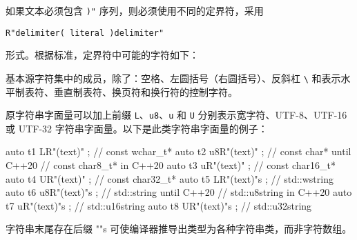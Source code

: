 如果文本必须包含 \verb|)"| 序列，则必须使用不同的定界符，采用

\verb|R"delimiter( literal )delimiter"|

形式。根据标准，定界符中可能的字符如下：

\begin{myTip}
基本源字符集中的成员，除了：空格、左圆括号（右圆括号）、反斜杠 \verb|\| 和表示水平制表符、垂直制表符、换页符和换行符的控制字符。
\end{myTip}

原字符串字面量可以加上前缀 \verb|L|、\verb|u8|、\verb|u| 和 \verb|U| 分别表示宽字符、UTF-8、UTF-16 或 UTF-32 字符串字面量。以下是此类字符串字面量的例子：

\begin{cpp}
auto t1{ LR"(text)"  };  // const wchar_t*
auto t2{ u8R"(text)" };  // const char* until C++20
// const char8_t* in C++20
auto t3{ uR"(text)"  };  // const char16_t*
auto t4{ UR"(text)"  };  // const char32_t*
auto t5{ LR"(text)"s  }; // std::wstring
auto t6{ u8R"(text)"s }; // std::string until C++20
// std::u8string in C++20
auto t7{ uR"(text)"s  }; // std::u16string
auto t8{ UR"(text)"s  }; // std::u32string
\end{cpp}

字符串末尾存在后缀 ""s 可使编译器推导出类型为各种字符串类，而非字符数组。










